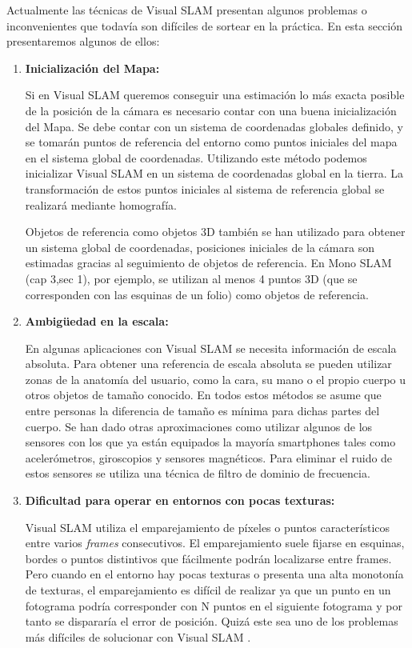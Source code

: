 Actualmente las técnicas de Visual SLAM presentan algunos problemas o inconvenientes que todavía son difíciles de sortear en la práctica. En esta sección presentaremos algunos de ellos:
\begin {enumerate}
\item \textbf{Inicialización del Mapa:}

Si en Visual SLAM queremos conseguir una estimación lo más exacta posible de la posición de la cámara es necesario contar con una buena inicialización del Mapa. Se debe contar con un sistema de coordenadas globales definido, y se tomarán puntos de referencia del entorno como puntos iniciales del mapa en el sistema global de coordenadas. Utilizando este método podemos inicializar Visual SLAM en un sistema de coordenadas global en la tierra. La transformación de estos puntos iniciales al sistema de referencia global se realizará mediante homografía.

Objetos de referencia como objetos 3D también se han utilizado para obtener un sistema global de coordenadas, posiciones iniciales de la cámara son estimadas gracias al seguimiento de objetos de referencia.
En Mono SLAM (cap 3,sec 1), por ejemplo, se utilizan al menos 4 puntos 3D (que se corresponden con las esquinas de un folio) como objetos de referencia.

\item \textbf{Ambigüedad en la escala:}

En algunas aplicaciones con Visual SLAM se necesita información de escala absoluta. Para obtener una referencia de escala absoluta se pueden utilizar zonas de la anatomía del usuario, como la cara, su mano o el propio cuerpo u otros objetos de tamaño conocido. En todos estos métodos se asume que entre personas la diferencia de tamaño es mínima para dichas partes del cuerpo. Se han dado otras aproximaciones como utilizar algunos de los sensores con los que ya están equipados la mayoría smartphones tales como acelerómetros, giroscopios y sensores magnéticos. Para eliminar el ruido de estos sensores se utiliza una técnica de filtro de dominio de frecuencia.


\item \textbf{Dificultad para operar en entornos con pocas texturas:}

Visual SLAM utiliza el emparejamiento de píxeles o puntos característicos entre varios \textit{frames} consecutivos. El emparejamiento suele fijarse en esquinas, bordes  o puntos distintivos que fácilmente podrán localizarse entre frames. Pero cuando en el entorno hay pocas texturas o presenta una alta monotonía de texturas,  el emparejamiento es difícil de realizar ya que un punto en un fotograma podría corresponder con N puntos en el siguiente fotograma y por tanto se dispararía el error de posición. Quizá este sea uno de los problemas más difíciles de solucionar con Visual SLAM
\cite{Takafumi17}.


\end{enumerate}
